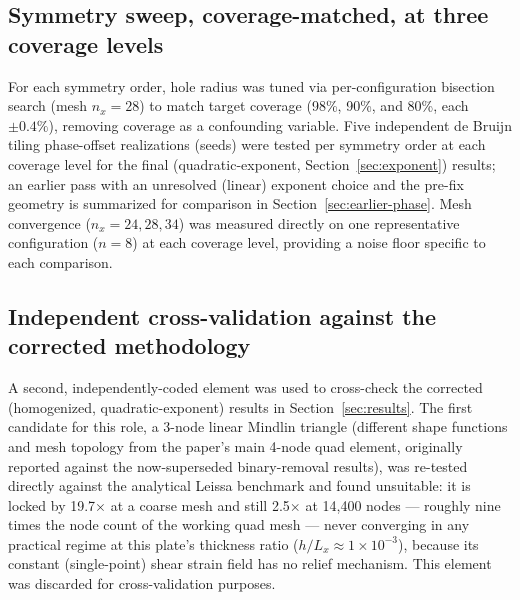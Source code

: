 \documentclass[11pt]{article}
\begin{document}
\subsection{Symmetry sweep, coverage-matched, at three coverage levels}
\label{sec:symmetry-protocol}

For each symmetry order, hole radius was tuned via per-configuration bisection search (mesh $n_x=28$) to match target coverage (98\%, 90\%, and 80\%, each $\pm0.4\%$), removing coverage as a confounding variable. Five independent de Bruijn tiling phase-offset realizations (seeds) were tested per symmetry order at each coverage level for the final (quadratic-exponent, Section~\ref{sec:exponent}) results; an earlier pass with an unresolved (linear) exponent choice and the pre-fix geometry is summarized for comparison in Section~\ref{sec:earlier-phase}. Mesh convergence ($n_x = 24, 28, 34$) was measured directly on one representative configuration ($n=8$) at each coverage level, providing a noise floor specific to each comparison.

\subsection{Independent cross-validation against the corrected methodology}
\label{sec:crossval}

A second, independently-coded element was used to cross-check the corrected (homogenized, quadratic-exponent) results in Section~\ref{sec:results}. The first candidate for this role, a 3-node linear Mindlin triangle (different shape functions and mesh topology from the paper's main 4-node quad element, originally reported against the now-superseded binary-removal results), was re-tested directly against the analytical Leissa benchmark and found unsuitable: it is locked by 19.7$\times$ at a coarse mesh and still 2.5$\times$ at 14{,}400 nodes --- roughly nine times the node count of the working quad mesh --- never converging in any practical regime at this plate's thickness ratio ($h/L_x \approx 1\times10^{-3}$), because its constant (single-point) shear strain field has no relief mechanism. This element was discarded for cross-validation purposes.
\end{document}
